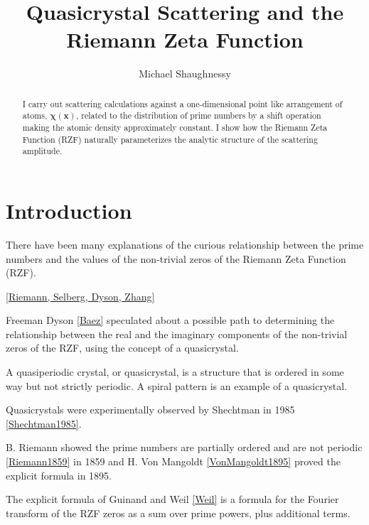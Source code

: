 \documentclass[11pt, oneside]{article}   	%
\title{Quasicrystal Scattering and the Riemann Zeta Function}
\author{Michael Shaughnessy}
\begin{document}
\maketitle

\begin{abstract}
I carry out scattering calculations against a one-dimensional point like arrangement of atoms, $\mathbf{\chi(x)}$, related to the distribution of prime numbers by a shift operation making the atomic density approximately constant. 
I show how the Riemann Zeta Function (RZF) naturally parameterizes the analytic structure of the scattering amplitude. 
\end{abstract}

\section{Introduction}

There have been many explanations of the curious relationship between the prime numbers and the values of the non-trivial zeros of the Riemann Zeta Function (RZF).

\ref{Riemann, Selberg, Dyson, Zhang}

Freeman Dyson \ref{Baez} speculated about a possible path to determining the relationship between the real and the imaginary components of the non-trivial zeros of the RZF, using the concept of a quasicrystal.

A quasiperiodic crystal, or quasicrystal, is a structure that is ordered in some way but not strictly periodic. A spiral pattern is an example of a quasicrystal. 

Quasicrystals were experimentally observed by Shechtman in 1985 \ref{Shechtman1985}. 

B. Riemann showed the prime numbers are partially ordered and are not periodic \ref{Riemann1859} in 1859 and H. Von Mangoldt \ref{VonMangoldt1895} proved the explicit formula in 1895.

The explicit formula of Guinand and Weil \ref{Weil} is a formula for the Fourier transform of the RZF zeros as a sum over prime powers, plus additional terms.  


\end{document}
